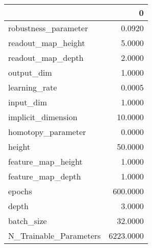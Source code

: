 \begin{tabular}{lr}
\toprule
{} &          0 \\
\midrule
robustness\_parameter   &     0.0920 \\
readout\_map\_height     &     5.0000 \\
readout\_map\_depth      &     2.0000 \\
output\_dim             &     1.0000 \\
learning\_rate          &     0.0005 \\
input\_dim              &     1.0000 \\
implicit\_dimension     &    10.0000 \\
homotopy\_parameter     &     0.0000 \\
height                 &    50.0000 \\
feature\_map\_height     &     1.0000 \\
feature\_map\_depth      &     1.0000 \\
epochs                 &   600.0000 \\
depth                  &     3.0000 \\
batch\_size             &    32.0000 \\
N\_Trainable\_Parameters &  6223.0000 \\
\bottomrule
\end{tabular}
